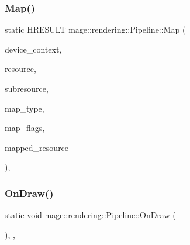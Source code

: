 \hypertarget{structmage_1_1rendering_1_1_pipeline_ab0176557cd5473bf5cd77836ca2d924f}{}\label{structmage_1_1rendering_1_1_pipeline_ab0176557cd5473bf5cd77836ca2d924f} 
\subsubsection{\texorpdfstring{Map()}{Map()}}
{\footnotesize\ttfamily static H\+R\+E\+S\+U\+LT mage\+::rendering\+::\+Pipeline\+::\+Map (\begin{DoxyParamCaption}\item[{I\+D3\+D11\+Device\+Context \&}]{device\+\_\+context,  }\item[{I\+D3\+D11\+Resource \&}]{resource,  }\item[{\hyperlink{namespacemage_a41c104c036fba3756a74e19f793eeaa1}{U32}}]{subresource,  }\item[{D3\+D11\+\_\+\+M\+AP}]{map\+\_\+type,  }\item[{\hyperlink{namespacemage_a41c104c036fba3756a74e19f793eeaa1}{U32}}]{map\+\_\+flags,  }\item[{D3\+D11\+\_\+\+M\+A\+P\+P\+E\+D\+\_\+\+S\+U\+B\+R\+E\+S\+O\+U\+R\+CE \&}]{mapped\+\_\+resource }\end{DoxyParamCaption})\hspace{0.3cm}{\ttfamily [static]}, {\ttfamily [noexcept]}}

\hypertarget{structmage_1_1rendering_1_1_pipeline_a9a6c518c985fa0b759df1625ff13a335}{}\label{structmage_1_1rendering_1_1_pipeline_a9a6c518c985fa0b759df1625ff13a335} 
\subsubsection{\texorpdfstring{On\+Draw()}{OnDraw()}}
{\footnotesize\ttfamily static void mage\+::rendering\+::\+Pipeline\+::\+On\+Draw (\begin{DoxyParamCaption}{ }\end{DoxyParamCaption})\hspace{0.3cm}{\ttfamily [static]}, {\ttfamily [private]}, {\ttfamily [noexcept]}}

\hypertarget{structmage_1_1rendering_1_1_pipeline_ac4ad95111168cc62686da885da9ab161}{}\label{structmage_1_1rendering_1_1_pipeline_ac4ad95111168cc62686da885da9ab161} 
